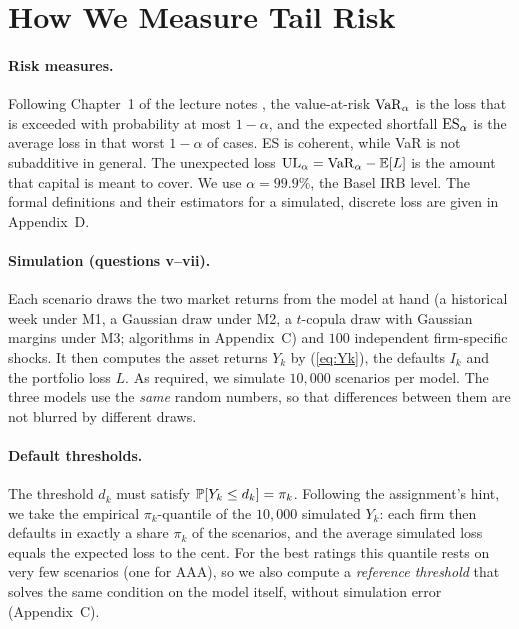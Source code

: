 \section{How We Measure Tail Risk}
\label{sec:method}


\paragraph{Risk measures.}
Following Chapter~1 of the lecture notes \citep{DeGiorgi26}, the value-at-risk $\VaR_\alpha$ is the loss that is exceeded with probability at most $1-\alpha$, and the expected shortfall $\ES_\alpha$ is the average loss in that worst $1-\alpha$ of cases. ES is coherent, while VaR is not subadditive in general. The unexpected loss $\UL_\alpha=\VaR_\alpha-\E[L]$ is the amount that capital is meant to cover. We use $\alpha=99.9\%$, the Basel IRB level. The formal definitions and their estimators for a simulated, discrete loss are given in Appendix~D.

\paragraph{Simulation (questions v--vii).}
Each scenario draws the two market returns from the model at hand (a historical week under M1, a Gaussian draw under M2, a $t$-copula draw with Gaussian margins under M3; algorithms in Appendix~C) and $100$ independent firm-specific shocks. It then computes the asset returns $Y_k$ by (\ref{eq:Yk}), the defaults $I_k$ and the portfolio loss $L$. As required, we simulate $10{,}000$ scenarios per model. The three models use the \emph{same} random numbers, so that differences between them are not blurred by different draws.

\paragraph{Default thresholds.}
The threshold $d_k$ must satisfy $\P[Y_k\le d_k]=\pi_k$. Following the assignment's hint, we take the empirical $\pi_k$-quantile of the $10{,}000$ simulated $Y_k$: each firm then defaults in exactly a share $\pi_k$ of the scenarios, and the average simulated loss equals the expected loss to the cent. For the best ratings this quantile rests on very few scenarios (one for AAA), so we also compute a \emph{reference threshold} that solves the same condition on the model itself, without simulation error (Appendix~C).

